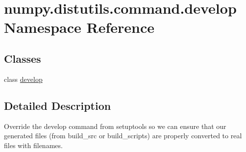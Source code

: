 \hypertarget{namespacenumpy_1_1distutils_1_1command_1_1develop}{}\section{numpy.\+distutils.\+command.\+develop Namespace Reference}
\label{namespacenumpy_1_1distutils_1_1command_1_1develop}
\subsection*{Classes}
\begin{DoxyCompactItemize}
\item 
class \hyperlink{classnumpy_1_1distutils_1_1command_1_1develop_1_1develop}{develop}
\end{DoxyCompactItemize}


\subsection{Detailed Description}
\begin{DoxyVerb}Override the develop command from setuptools so we can ensure that our
generated files (from build_src or build_scripts) are properly converted to real
files with filenames.\end{DoxyVerb}
 